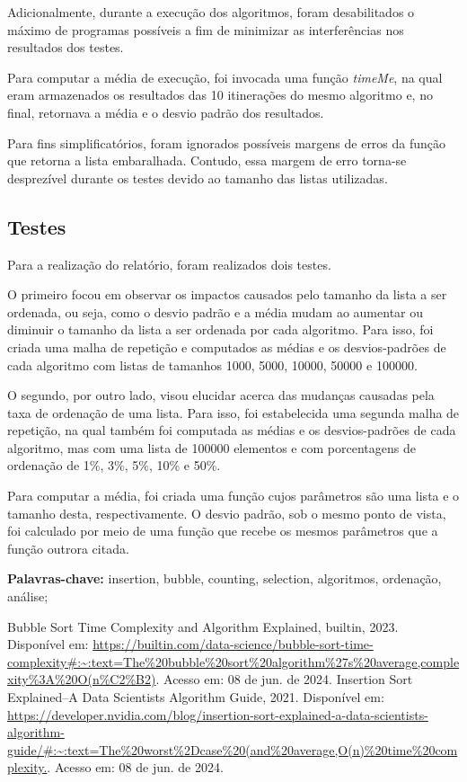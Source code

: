 \documentclass[10pt,a4paper]{article}
\begin{document}
Adicionalmente, durante a execução dos algoritmos, foram desabilitados o máximo de programas possíveis a fim de minimizar as interferências nos resultados dos testes. 

Para computar a média de execução, foi invocada uma função \textit{timeMe}, na qual eram armazenados os resultados das 10 itinerações do mesmo algoritmo e, no final, retornava a média e o desvio padrão dos resultados.

Para fins simplificatórios, foram ignorados possíveis margens de erros da função que retorna a lista embaralhada. Contudo, essa margem de erro torna-se desprezível durante os testes devido ao tamanho das listas utilizadas.
\subsection*{Testes}
    Para a realização do relatório, foram realizados dois testes. 
    
    O primeiro focou em observar os impactos causados pelo tamanho da lista a ser ordenada, ou seja, como o desvio padrão e a média mudam ao aumentar ou diminuir o tamanho da lista a ser ordenada por cada algoritmo. 
    Para isso, foi criada uma malha de repetição e computados as médias e os desvios-padrões de cada algoritmo com listas de tamanhos 1000, 5000, 10000, 50000 e 100000.
    
    O segundo, por outro lado, visou elucidar acerca das mudanças causadas pela taxa de ordenação de uma lista.
    Para isso, foi estabelecida uma segunda malha de repetição, na qual também foi computada as médias e os desvios-padrões de cada algoritmo, mas com uma lista de 100000 elementos e com porcentagens de ordenação de 1\%, 3\%, 5\%, 10\% e 50\%.
    

    Para computar a média, foi criada uma função cujos parâmetros são uma lista e o tamanho desta, respectivamente. O desvio padrão, sob o mesmo ponto de vista, foi calculado por meio de uma função que recebe os mesmos parâmetros que a função outrora citada.
    

\noindent\textbf{Palavras-chave:} insertion, bubble, counting, selection, algoritmos, ordenação, análise;

\newpage
\tableofcontents










\begin{thebibliography}{3}
    Bubble Sort Time Complexity and Algorithm Explained, builtin, 2023. Disponível em: \url{https://builtin.com/data-science/bubble-sort-time-complexity#:~:text=The%20bubble%20sort%20algorithm%27s%20average,complexity%3A%20O(n%C2%B2)}. Acesso em: 08 de jun. de 2024.
    Insertion Sort Explained–A Data Scientists Algorithm Guide, 2021. Disponível em: \url{https://developer.nvidia.com/blog/insertion-sort-explained-a-data-scientists-algorithm-guide/#:~:text=The%20worst%2Dcase%20(and%20average,O(n)%20time%20complexity.}. Acesso em: 08 de jun. de 2024.
\end{thebibliography}
\end{document}
